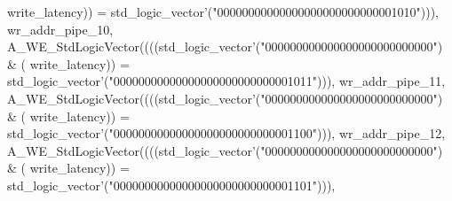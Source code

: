 \begin{DoxyCode}
{      write_latency}\textcolor{vhdlchar}{)}\textcolor{vhdlchar}{)} \textcolor{vhdlchar}{=} \textcolor{comment}{std\_logic\_vector}\textcolor{vhdlchar}{'}\textcolor{vhdlchar}{(}\textcolor{vhdllogic}{"00000000000000000000000000001010"}\textcolor{vhdlchar}{)}\textcolor{vhdlchar}{)}\textcolor{vhdlchar}{)}\textcolor{vhdlchar}{,} \textcolor{vhdlchar}{
      wr_addr_pipe_10}\textcolor{vhdlchar}{,} \textcolor{vhdlchar}{A\_WE\_StdLogicVector}\textcolor{vhdlchar}{(}\textcolor{vhdlchar}{(}\textcolor{vhdlchar}{(}\textcolor{vhdlchar}{(}\textcolor{comment}{std\_logic\_vector}\textcolor{vhdlchar}{'}\textcolor{vhdlchar}{(}\textcolor{vhdllogic}{"000000000000000000000000000"}\textcolor{vhdlchar}{)} \textcolor{vhdlchar}{&} \textcolor{vhdlchar}{(}\textcolor{vhdlchar}{
      write_latency}\textcolor{vhdlchar}{)}\textcolor{vhdlchar}{)} \textcolor{vhdlchar}{=} \textcolor{comment}{std\_logic\_vector}\textcolor{vhdlchar}{'}\textcolor{vhdlchar}{(}\textcolor{vhdllogic}{"00000000000000000000000000001011"}\textcolor{vhdlchar}{)}\textcolor{vhdlchar}{)}\textcolor{vhdlchar}{)}\textcolor{vhdlchar}{,} \textcolor{vhdlchar}{
      wr_addr_pipe_11}\textcolor{vhdlchar}{,} \textcolor{vhdlchar}{A\_WE\_StdLogicVector}\textcolor{vhdlchar}{(}\textcolor{vhdlchar}{(}\textcolor{vhdlchar}{(}\textcolor{vhdlchar}{(}\textcolor{comment}{std\_logic\_vector}\textcolor{vhdlchar}{'}\textcolor{vhdlchar}{(}\textcolor{vhdllogic}{"000000000000000000000000000"}\textcolor{vhdlchar}{)} \textcolor{vhdlchar}{&} \textcolor{vhdlchar}{(}\textcolor{vhdlchar}{
      write_latency}\textcolor{vhdlchar}{)}\textcolor{vhdlchar}{)} \textcolor{vhdlchar}{=} \textcolor{comment}{std\_logic\_vector}\textcolor{vhdlchar}{'}\textcolor{vhdlchar}{(}\textcolor{vhdllogic}{"00000000000000000000000000001100"}\textcolor{vhdlchar}{)}\textcolor{vhdlchar}{)}\textcolor{vhdlchar}{)}\textcolor{vhdlchar}{,} \textcolor{vhdlchar}{
      wr_addr_pipe_12}\textcolor{vhdlchar}{,} \textcolor{vhdlchar}{A\_WE\_StdLogicVector}\textcolor{vhdlchar}{(}\textcolor{vhdlchar}{(}\textcolor{vhdlchar}{(}\textcolor{vhdlchar}{(}\textcolor{comment}{std\_logic\_vector}\textcolor{vhdlchar}{'}\textcolor{vhdlchar}{(}\textcolor{vhdllogic}{"000000000000000000000000000"}\textcolor{vhdlchar}{)} \textcolor{vhdlchar}{&} \textcolor{vhdlchar}{(}\textcolor{vhdlchar}{
      write_latency}\textcolor{vhdlchar}{)}\textcolor{vhdlchar}{)} \textcolor{vhdlchar}{=} \textcolor{comment}{std\_logic\_vector}\textcolor{vhdlchar}{'}\textcolor{vhdlchar}{(}\textcolor{vhdllogic}{"00000000000000000000000000001101"}\textcolor{vhdlchar}{)}\textcolor{vhdlchar}{)}\textcolor{vhdlchar}{)}\textcolor{vhdlchar}{,} \textcolor{vhdlchar}{
}
\end{DoxyCode}
